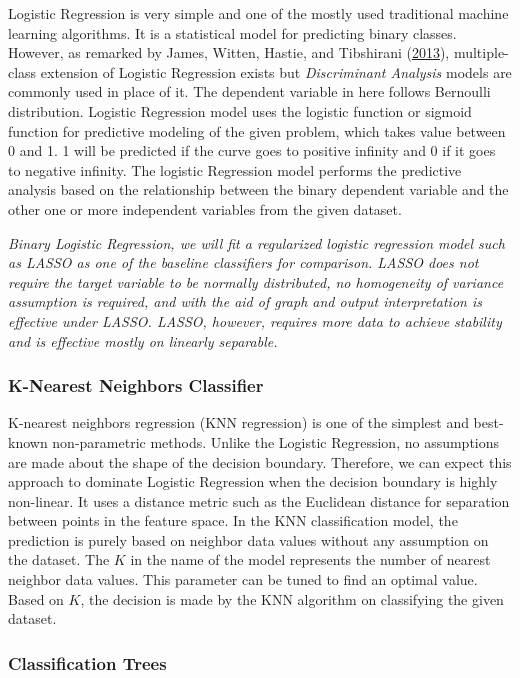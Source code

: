 \documentclass[
  10pt,
]{article}
\begin{document}
Logistic Regression is very simple and one of the mostly used traditional machine learning algorithms. It is a statistical model for predicting binary classes. However, as remarked by James, Witten, Hastie, and Tibshirani (\protect\hyperlink{ref-james2013introduction}{2013}), multiple-class extension of Logistic Regression exists but \emph{Discriminant Analysis} models are commonly used in place of it. The dependent variable in here follows Bernoulli distribution. Logistic Regression model uses the logistic function or sigmoid function for predictive modeling of the given problem, which takes value between 0 and 1. 1 will be predicted if the curve goes to positive infinity and 0 if it goes to negative infinity. The logistic Regression model performs the predictive analysis based on the relationship between the binary dependent variable and the other one or more independent variables from the given dataset.

\emph{Binary Logistic Regression, we will fit a regularized logistic regression model such as LASSO as one of the baseline classifiers for comparison. LASSO does not require the target variable to be normally distributed, no homogeneity of variance assumption is required, and with the aid of graph and output interpretation is effective under LASSO. LASSO, however, requires more data to achieve stability and is effective mostly on linearly separable.}

\subsubsection{K-Nearest Neighbors Classifier}

K-nearest neighbors regression (KNN regression) is one of the simplest and best-known
non-parametric methods. Unlike the Logistic Regression, no assumptions are made about the shape of the decision boundary. Therefore, we can expect this approach to dominate Logistic Regression when the decision boundary is highly non-linear. It uses a distance metric such as the Euclidean distance for separation between points in the feature space. In the KNN classification model, the prediction is purely based on neighbor data values without any assumption on the dataset. The \(K\) in the name of the model represents the number of nearest neighbor data values. This parameter can be tuned to find an optimal value. Based on \(K\), the decision is made by the KNN algorithm on classifying the given dataset.

\subsubsection{Classification Trees}
\end{document}

